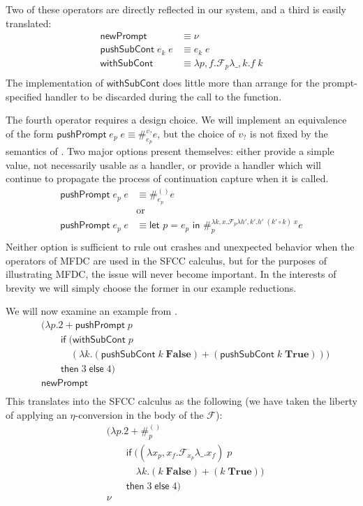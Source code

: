 \documentclass[11pt]{article}
\newcommand{\letin}[2]{\textsf{let }#1\textsf{ in }#2}
\newcommand\F{\mathcal{F}}
\begin{document}
Two of these operators are directly reflected in our system, and a third is easily translated:
\begin{align*}
\mathsf{newPrompt} &\equiv \nu \\
\mathsf{pushSubCont}\;e_k\;e &\equiv e_k\;e \\
\mathsf{withSubCont} &\equiv
    \lambda p,f. \F_{p}\lambda \_,k. f\;k \\
\end{align*}
The implementation of $\mathsf{withSubCont}$ does little more than arrange for the prompt-specified handler to be discarded during the call to the function.

The fourth operator requires a design choice.
We will implement an equivalence of the form $\mathsf{pushPrompt}\;e_p\;e \equiv \#_{e_p}^{v_?}e$, but the choice of $v_?$ is not fixed by the semantics of \cite{MFDC}.
Two major options present themselves:
either provide a simple value, not necessarily usable as a handler,
or provide a handler which will continue to propagate the process of continuation capture when it is called.
\begin{align*}
\mathsf{pushPrompt}\;e_p\;e &\equiv \#_{e_p}^{()}e \\
&\textrm{or} \\
\mathsf{pushPrompt}\;e_p\;e &\equiv
    \letin{p=e_p}\#_{p}^{\lambda k,x.\F_{p}\lambda h',k'.h'\;(k' \circ k)\;x}e \\
\end{align*}
Neither option is sufficient to rule out crashes and unexpected behavior when the operators of MFDC are used in the SFCC calculus, but for the purposes of illustrating MFDC, the issue will never become important.
In the interests of brevity we will simply choose the former in our example reductions.

We will now examine an example from \cite{MFDC}.
\begin{align*}
&(\lambda p. 2 + \mathsf{pushPrompt}\;p \\
&\qquad \mathsf{if}\;(\mathsf{withSubCont}\;p \\
&\qquad\quad (\lambda k. (\mathsf{pushSubCont}\;k\;\mathbf{False}) +
            (\mathsf{pushSubCont}\;k\;\mathbf{True}))) \\
&\qquad \mathsf{then}\;3\;\mathsf{else}\;4) \\
&\mathsf{newPrompt} \\
\end{align*}
This translates into the SFCC calculus as the following (we have taken the liberty of applying an $\eta$-conversion in the body of the $\F$):
\begin{align*}
&(\lambda p. 2 + \#_p^{()} \\
&\qquad \mathsf{if}\;((\lambda x_p,x_f. \F_{x_p}\lambda \_.x_f)\;p \\
&\qquad\quad \lambda k. (k\;\mathbf{False}) +
            (k\;\mathbf{True})) \\
&\qquad \mathsf{then}\;3\;\mathsf{else}\;4) \\
&\nu \\
\end{align*}
\end{document}
